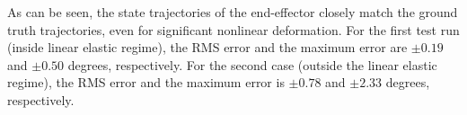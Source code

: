 As can be seen, the state trajectories of the end-effector closely match the ground truth trajectories, even for significant nonlinear deformation. For the first  test  run (inside linear elastic regime), the RMS error and the maximum error are $\pm0.19$ and $\pm 0.50$ degrees, respectively. For the second case (outside the linear elastic regime), the RMS error and the maximum error is $\pm0.78$ and $\pm 2.33$ degrees, respectively.

